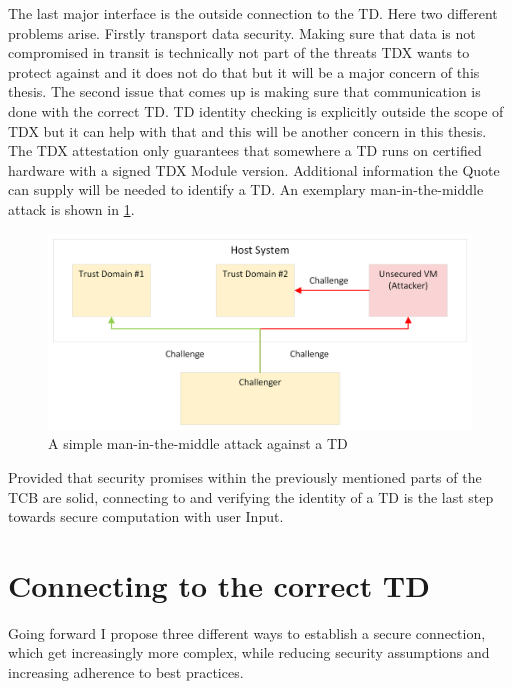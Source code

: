 The last major interface is the outside connection to the TD. Here two different problems arise. Firstly transport data security. Making sure that data is not compromised in transit is technically not part of the threats TDX wants to protect against and it does not do that but it will be a major concern of this thesis. The second issue that comes up is making sure that communication is done with the correct TD. TD identity checking is explicitly outside the scope of TDX but it can help with that and this will be another concern in this thesis. The TDX attestation only guarantees that somewhere a TD runs on certified hardware with a signed TDX Module version. Additional information the Quote can supply will be needed to identify a TD. An exemplary man-in-the-middle attack is shown in \ref{fig:man_in_the_middle}.
\begin{figure}
   \centering
       \includegraphics[width=.75\textwidth]{figures/Man-In-The-Middle.png} 
 \caption{A simple man-in-the-middle attack against a TD}
 \label{fig:man_in_the_middle}
\end{figure}
Provided that security promises within the previously mentioned parts of the TCB are solid, connecting to and verifying the identity of a \Gls{TD} is the last step towards secure computation with user Input.

\section{Connecting to the correct TD}

Going forward I propose three different ways to establish a secure connection, which get increasingly more complex, while reducing security assumptions and increasing adherence to best practices.

